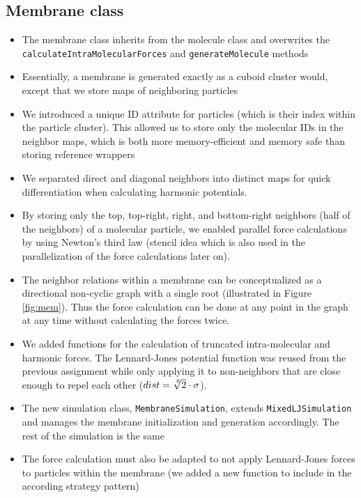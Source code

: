 \documentclass{article}
\begin{document}
    \subsection{Membrane class}
    \label{sec:mem:mem}
        \begin{itemize}
            \item The membrane class inherits from the molecule class and overwrites the \texttt{calculateIntraMolecularForces} and \texttt{generateMolecule} methods
            \item Essentially, a membrane is generated exactly as a cuboid cluster would, except that we store maps of neighboring particles 
            \item We introduced a unique ID attribute for particles (which is their index within the particle cluster). This allowed us to store only the molecular IDs in the neighbor maps, which is both more memory-efficient and memory safe than storing reference wrappers
            \item We separated direct and diagonal neighbors into distinct maps for quick differentiation when calculating harmonic potentials.
            \item By storing only the top, top-right, right, and bottom-right neighbors (half of the neighbors) of a molecular particle, we enabled parallel force calculations by using Newton's third law (stencil idea which is also used in the parallelization of the force calculations later on).
            \item The neighbor relations within a membrane can be conceptualized as a directional non-cyclic graph with a single root (illustrated in Figure \ref{fig:mem}). Thus the force calculation can be done at any point in the graph at any time without calculating the forces twice.
            \item We added functions for the calculation of truncated intra-molecular and harmonic forces. The Lennard-Jones potential function was reused from the previous assignment while only applying it to non-neighbors that are close enough to repel each other ($dist = \sqrt[\leftroot{-2}\uproot{2}6]{2} \cdot \sigma$).
            \item The new simulation class, \texttt{MembraneSimulation}, extends \texttt{MixedLJSimulation} and manages the membrane initialization and generation accordingly. The rest of the simulation is the same
            \item The force calculation must also be adapted to not apply Lennard-Jones forces to particles within the membrane (we added a new function to include in the according strategy pattern)
        \end{itemize}
\end{document}
